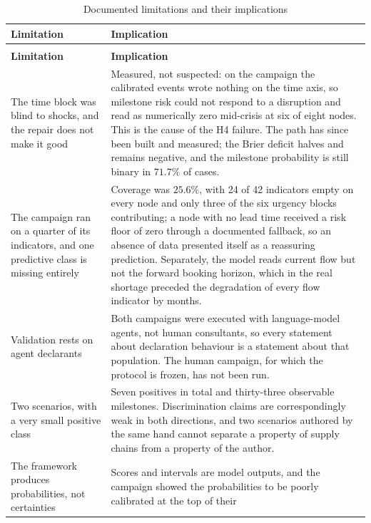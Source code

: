 \begin{longtable}{@{}>{\raggedright\arraybackslash}p{4.2cm} p{11.0cm}@{}}
\caption{Documented limitations and their implications}
\label{tab:limitations} \\
\toprule
\textbf{Limitation} & \textbf{Implication} \\
\midrule
\endfirsthead
\multicolumn{2}{@{}l}{\small\itshape Table~\ref{tab:limitations}, continued} \\
\toprule
\textbf{Limitation} & \textbf{Implication} \\
\midrule
\endhead
\bottomrule
\endlastfoot
The time block was blind to shocks, and the repair does not make it good & Measured, not
suspected: on the campaign the calibrated events wrote nothing on the time axis, so milestone
risk could not respond to a disruption and read as numerically zero mid-crisis at six of eight
nodes. This is the cause of the H4 failure. The path has since been built and measured; the
Brier deficit halves and remains negative, and the milestone probability is still binary in
$71.7\%$ of cases. \\[3pt]
\midrule
The campaign ran on a quarter of its indicators, and one predictive class is missing entirely
& Coverage was $25.6\%$, with 24 of 42 indicators empty on every node and only three of the
six urgency blocks contributing; a node with no lead time received a risk floor of zero
through a documented fallback, so an absence of data presented itself as a reassuring
prediction. Separately, the model reads current flow but not the forward booking horizon,
which in the real shortage preceded the degradation of every flow indicator by months. \\[3pt]
\midrule
Validation rests on agent declarants & Both campaigns were executed with language-model
agents, not human consultants, so every statement about declaration behaviour is a statement
about that population. The human campaign, for which the protocol is frozen, has not been
run. \\[3pt]
\midrule
Two scenarios, with a very small positive class & Seven positives in total and thirty-three
observable milestones. Discrimination claims are correspondingly weak in both directions, and
two scenarios authored by the same hand cannot separate a property of supply chains from a
property of the author. \\[3pt]
\midrule
The framework produces probabilities, not certainties & Scores and intervals are model
outputs, and the campaign showed the probabilities to be poorly calibrated at the top of their

\end{longtable}

